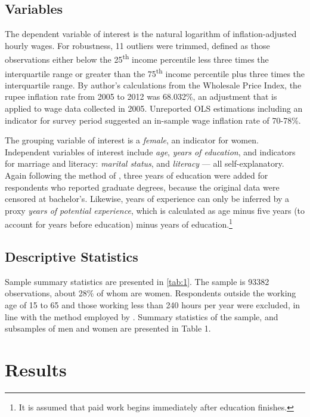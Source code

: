 \documentclass[12pt]{article}
\begin{document}
\subsection{Variables}

The dependent variable of interest is the natural logarithm of inflation-adjusted hourly wages. For robustness, 11 outliers were trimmed, defined as those observations either below the 25\textsuperscript{th} income percentile less three times the interquartile range or greater than the 75\textsuperscript{th} income percentile plus three times the interquartile range. By author's calculations from the Wholesale Price Index, the rupee inflation rate from 2005 to 2012 was 68.032\%, an adjustment that is applied to wage data collected in 2005. Unreported OLS estimations including an indicator for survey period suggested an in-sample wage inflation rate of 70-78\%.

The grouping variable of interest is a \textit{female}, an indicator for women. Independent variables of interest include \textit{age}, \textit{years of education}, and indicators for marriage and literacy: \textit{marital status}, and \textit{literacy} --- all self-explanatory. Again following the method of \citet{Agrawal2014}, three years of education were added for respondents who reported graduate degrees, because the original data were censored at bachelor's. Likewise, years of experience can only be inferred by a proxy \textit{years of potential experience}, which is calculated as age minus five years (to account for years before education) minus years of education.\footnote{It is assumed that paid work begins immediately after education finishes.}

\subsection{Descriptive Statistics}

Sample summary statistics are presented in \ref{tab:1}. The sample is 93382 observations, about 28\% of whom are women. Respondents outside the working age of 15 to 65 and those working less than 240 hours per year were excluded, in line with the method employed by \citet{Agrawal2014}. Summary statistics of the sample, and subsamples of men and women are presented in Table 1. 

\section{Results
\label{sec:results}}
\end{document}
